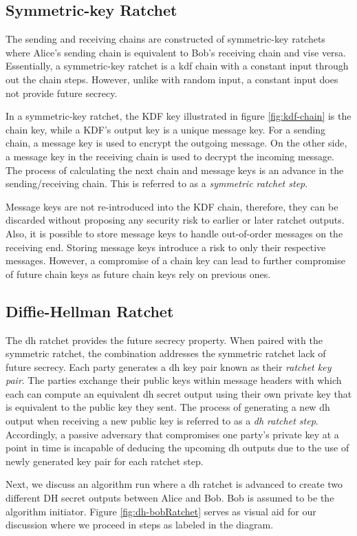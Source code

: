 \subsection{Symmetric-key Ratchet}
	
The sending and receiving chains are constructed of symmetric-key ratchets where Alice's sending chain is equivalent to Bob's receiving chain and vise versa. Essentially, a symmetric-key ratchet is a \gls{kdf} chain with a constant input through out the chain steps. However, unlike with random input, a constant input does not provide future secrecy.
\par
In a symmetric-key ratchet, the KDF key illustrated in figure \ref{fig:kdf-chain} is the chain key, while a KDF's output key is a unique message key. For a sending chain, a message key is used to encrypt the outgoing message. On the other side, a message key in the receiving chain is used to decrypt the incoming message. The process of calculating the next chain and message keys is an advance in the sending/receiving chain. This is referred to as a \textit{symmetric ratchet step}.
\par
Message keys are not re-introduced into the KDF chain, therefore, they can be discarded without proposing any security risk to earlier or later ratchet outputs. Also, it is possible to store message keys to handle out-of-order messages on the receiving end. Storing message keys introduce a risk to only their respective messages. However, a compromise of a chain key can lead to further compromise of future chain keys as future chain keys rely on previous ones.

\subsection{Diffie-Hellman Ratchet}
The \gls{dh} ratchet provides the future secrecy property. When paired with the symmetric ratchet, the combination addresses the symmetric ratchet lack of future secrecy. 
Each party generates a \gls{dh} key pair known as their \textit{ratchet key pair}. The parties exchange their public keys within message headers with which each can compute an equivalent \gls{dh} secret output using their own private key that is equivalent to the public key they sent. The process of generating a new \gls{dh} output when receiving a new public key is referred to as a \textit{\gls{dh} ratchet step}. Accordingly, a passive adversary that compromises one party's private key at a point in time is incapable of deducing the upcoming \gls{dh} outputs due to the use of newly generated key pair for each ratchet step.
\par
Next, we discuss an algorithm run where a \gls{dh} ratchet is advanced to create two different DH secret outputs between Alice and Bob. Bob is assumed to be the algorithm initiator. Figure \ref{fig:dh-bobRatchet} serves as visual aid for our discussion where we proceed in steps as labeled in the diagram.

